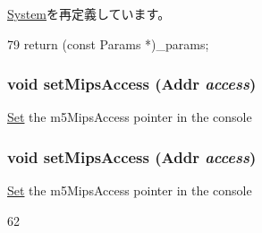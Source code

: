 \hyperlink{classSystem_acd3c3feb78ae7a8f88fe0f110a718dff}{System}を再定義しています。


\begin{DoxyCode}
79 { return (const Params *)_params; }
\end{DoxyCode}
\hypertarget{classMipsSystem_a22b402a730d5f7c377a16e7ce2754e7f}{
\subsubsection[{setMipsAccess}]{\setlength{\rightskip}{0pt plus 5cm}void setMipsAccess ({\bf Addr} {\em access})}}
\label{classMipsSystem_a22b402a730d5f7c377a16e7ce2754e7f}
\hyperlink{classSet}{Set} the m5MipsAccess pointer in the console \hypertarget{classMipsSystem_a22b402a730d5f7c377a16e7ce2754e7f}{
\subsubsection[{setMipsAccess}]{\setlength{\rightskip}{0pt plus 5cm}void setMipsAccess ({\bf Addr} {\em access})}}
\label{classMipsSystem_a22b402a730d5f7c377a16e7ce2754e7f}
\hyperlink{classSet}{Set} the m5MipsAccess pointer in the console 


\begin{DoxyCode}
62 {}
\end{DoxyCode}


